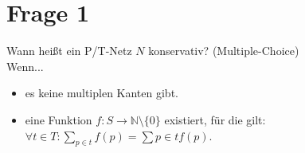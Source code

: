 \documentclass[12pt]{article}
\begin{document}
\section*{Frage 1}
Wann heißt ein P/T-Netz $N$ konservativ? (Multiple-Choice)\\
Wenn...
\begin{itemize}
\item es keine multiplen Kanten gibt.
\item eine Funktion $f:S \to \mathbb{N}\setminus \{ 0 \}$ existiert, für die gilt:$\forall t \in T: \sum_{p \in t}f(p) = \sum{p \in t}{}f(p)$.
\end{itemize}
\end{document}
